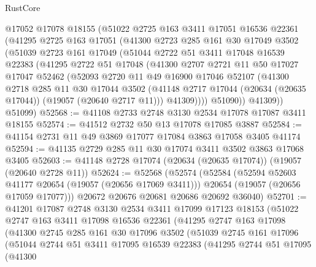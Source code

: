 \begin{lexlean}{RustCore}
\begin{coremodule}
    @17052
    @17078
    @18155
    (@51022
      @2725
      @163
      @3411
      @17051
      @16536
      @22361
      (@41295
        @2725
        @163
        @17051
        (@41300
          @2723
          @285
          @161
          @30
          @17049
          @3502
          (@51039
            @2723
            @161
            @17049
            (@51044
              @2722
              @51
              @3411
              @17048
              @16539
              @22383
              (@41295
                @2722
                @51
                @17048
                (@41300
                  @2707
                  @2721
                  @11
                  @50
                  @17027
                  @17047
                  @52462
                  (@52093
                    @2720
                    @11
                    @49
                    @16900
                    @17046
                    @52107
                    (@41300
                      @2718
                      @285
                      @11
                      @30
                      @17044
                      @3502
                      (@41148 @2717 @17044 (@20634 (@20635 @17044)) (@19057 (@20640 @2717 @11)))
                      @41309))))
              @51090))
          @41309))
      @51099)
@52568 := @41108 @2733 @2748 @3130 @2534 @17078 @17087 @3411 @18155
@52574 := @41512 @2732 @50 @13 @17078 @17085 @3887
@52584 := @41154 @2731 @11 @49 @3869 @17077 @17084 @3863 @17058 @3405 @41174
@52594 := @41135 @2729 @285 @11 @30 @17074 @3411 @3502 @3863 @17068 @3405
@52603 := @41148 @2728 @17074 (@20634 (@20635 @17074)) (@19057 (@20640 @2728 @11))
@52624 := @52568
    (@52574
      (@52584
        (@52594 @52603 @41177 @20654 (@19057 (@20656 @17069 @3411)))
        @20654
        (@19057 (@20656 @17059 @17077)))
      @20672
      @20676
      @20681
      @20686
      @20692
      @36040)
@52701 := @41201
    @17087
    @2748
    @3130
    @2534
    @3411
    @17099
    @17123
    @18153
    (@51022
      @2747
      @163
      @3411
      @17098
      @16536
      @22361
      (@41295
        @2747
        @163
        @17098
        (@41300
          @2745
          @285
          @161
          @30
          @17096
          @3502
          (@51039
            @2745
            @161
            @17096
            (@51044
              @2744
              @51
              @3411
              @17095
              @16539
              @22383
              (@41295
                @2744
                @51
                @17095
                (@41300

\end{coremodule}
\end{lexlean}
